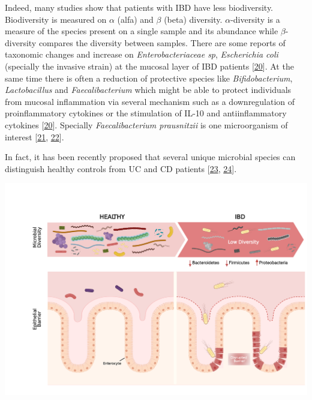 \documentclass[
  12pt,
  a4paper,
  twoside,
  openright]{book}
\let\origfigure\figure
\let\endorigfigure\endfigure
\renewenvironment{figure}[1][2] {
    \expandafter\origfigure\expandafter[!htp]
} {
    \endorigfigure
}
\begin{document}
Indeed, many studies show that patients with IBD have less biodiversity.
Biodiversity is measured on \(\alpha\) (alfa) and \(\beta\) (beta) diversity.
\(\alpha\)-diversity is a measure of the species present on a single sample and its abundance while \(\beta\)-diversity compares the diversity between samples.
There are some reports of taxonomic changes and increase on \emph{Enterobacteriaceae sp}, \emph{Escherichia coli} (specially the invasive strain) at the mucosal layer of IBD patients {[}\protect\hyperlink{ref-ott2004}{20}{]}.
At the same time there is often a reduction of protective species like \emph{Bifidobacterium}, \emph{Lactobacillus} and \emph{Faecalibacterium} which might be able to protect individuals from mucosal inflammation via several mechanism such as a downregulation of proinflammatory cytokines or the stimulation of IL-10 and antiinflammatory cytokines {[}\protect\hyperlink{ref-ott2004}{20}{]}.
Specially \emph{Faecalibacterium prausnitzii} is one microorganism of interest {[}\protect\hyperlink{ref-kostic2014}{21}, \protect\hyperlink{ref-sender2016}{22}{]}.

In fact, it has been recently proposed that several unique microbial species can distinguish healthy controls from UC and CD patients {[}\protect\hyperlink{ref-sankarasubramanian2020}{23}, \protect\hyperlink{ref-lopez-siles2014}{24}{]}.

\begin{figure}
\includegraphics[width=1\linewidth]{images/tesis_AM_Figure2} \caption[The microbial composition in the gut.]{The microbial composition in the gut. On the left healthy gut is represented as having a high microbiome diversity and no damage on the epithelial barrier. On the right the IBD gut were microbiome diversity is lower and some bacteria is in physical contact with the damaged epithelium}\label{fig:composition}
\end{figure}
\end{document}
